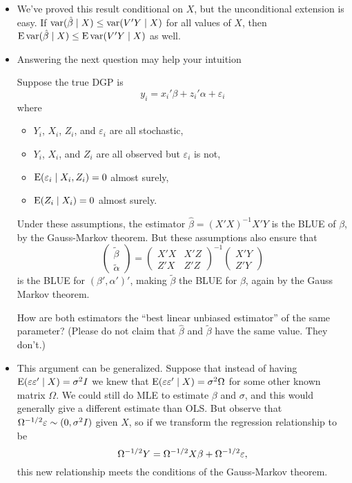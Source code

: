 \begin{itemize}[leftmargin=0pt]
\item We've proved this result conditional on $X$, but the
  unconditional extension is easy.  If $\operatorname{var}(\hat{\beta} \mid X) \leq \operatorname{var}(V'Y \mid X)$
  for all values of $X$, then $\operatorname{E} \operatorname{var}(\hat{\beta} \mid X) \leq \operatorname{E} \operatorname{var}(V'Y \mid X)$ as
  well.

\item Answering the next question may help your intuition
  \begin{hw}
    Suppose the true DGP is
    \begin{equation*}
      y_i = x_i'\beta + z_i'\alpha + \varepsilon_i
    \end{equation*}
    where
    \begin{itemize}
    \item $Y_i$, $X_i$, $Z_i$, and $\varepsilon_i$ are all stochastic,
    \item $Y_i$, $X_i$, and $Z_i$ are all observed but $\varepsilon_i$ is not,
    \item $\operatorname{E}(\varepsilon_i \mid X_i, Z_i) = 0$ almost surely,
    \item $\operatorname{E}(Z_i \mid X_i) = 0$ almost surely.
    \end{itemize}
    Under these assumptions, the estimator $\hat \beta = (X'X)^{-1}
    X'Y$ is the BLUE of $\beta$, by the Gauss-Markov theorem.  But
    these assumptions also ensure that
    \begin{equation*}
      \begin{pmatrix} \tilde \beta \\ \tilde \alpha \end{pmatrix} =
      \begin{pmatrix} X'X & X'Z \\ Z'X & Z'Z \end{pmatrix}^{-1}
      \begin{pmatrix} X'Y \\ Z'Y \end{pmatrix}
    \end{equation*}
    is the BLUE for $(\beta',\alpha')'$, making $\tilde\beta$ the BLUE
    for $\beta$, again by the Gauss Markov theorem.

    How are both estimators the ``best linear unbiased estimator'' of
    the same parameter?  (Please do not claim that $\hat\beta$ and
    $\tilde\beta$ have the same value. They don't.)
  \end{hw}

\item This argument can be generalized.  Suppose that instead of
  having $\operatorname{E}(\varepsilon \varepsilon' \mid X) = \sigma^2 I$ we knew that $\operatorname{E}(\varepsilon \varepsilon' \mid X) = \sigma^2
  \Omega$ for some other known matrix $\Omega$.  We could still do MLE to
  estimate $\beta$ and $\sigma$, and this would generally give a different
  estimate than OLS.  But observe that $\Omega^{-1/2} \varepsilon \sim (0, \sigma^2 I)$ given
  $X$, so if we transform the regression relationship to be
  \begin{equation*}
    \Omega^{-1/2} Y = \Omega^{-1/2} X \beta + \Omega^{-1/2} \varepsilon,
  \end{equation*}
  this new relationship meets the conditions of the Gauss-Markov
  theorem.


\end{itemize}
